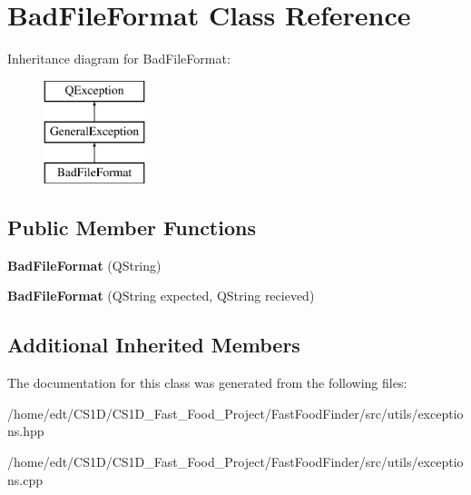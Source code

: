 \hypertarget{classBadFileFormat}{\section{Bad\-File\-Format Class Reference}
\label{classBadFileFormat}
}
Inheritance diagram for Bad\-File\-Format\-:\begin{figure}[H]
\begin{center}
\leavevmode
\includegraphics[height=3.000000cm]{classBadFileFormat}
\end{center}
\end{figure}
\subsection*{Public Member Functions}
\begin{DoxyCompactItemize}
\item 
\hypertarget{classBadFileFormat_af19928d559340e281b323edf230aa1bd}{{\bfseries Bad\-File\-Format} (Q\-String)}\label{classBadFileFormat_af19928d559340e281b323edf230aa1bd}

\item 
\hypertarget{classBadFileFormat_aee1f0e6299860c1ce8a04e65a149b42c}{{\bfseries Bad\-File\-Format} (Q\-String expected, Q\-String recieved)}\label{classBadFileFormat_aee1f0e6299860c1ce8a04e65a149b42c}

\end{DoxyCompactItemize}
\subsection*{Additional Inherited Members}


The documentation for this class was generated from the following files\-:\begin{DoxyCompactItemize}
\item 
/home/edt/\-C\-S1\-D/\-C\-S1\-D\-\_\-\-Fast\-\_\-\-Food\-\_\-\-Project/\-Fast\-Food\-Finder/src/utils/exceptions.\-hpp\item 
/home/edt/\-C\-S1\-D/\-C\-S1\-D\-\_\-\-Fast\-\_\-\-Food\-\_\-\-Project/\-Fast\-Food\-Finder/src/utils/exceptions.\-cpp\end{DoxyCompactItemize}
